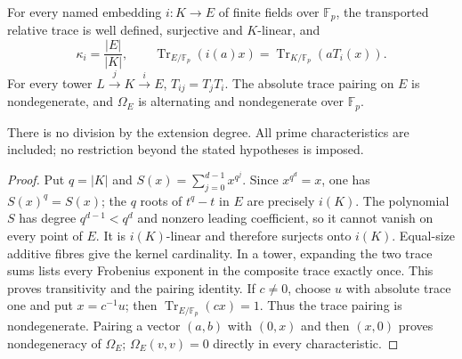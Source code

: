 \begin{theorem}
{\normalfont\statusProved}\quad
For every named embedding $i:K\to E$ of finite fields over
$\mathbb F_p$, the transported relative trace is well defined,
surjective and $K$-linear, and
\[
 \kappa_i=\frac{|E|}{|K|},\qquad
 \operatorname{Tr}_{E/\mathbb F_p}(i(a)x)
 =\operatorname{Tr}_{K/\mathbb F_p}(aT_i(x)).
\]
For every tower $L\xrightarrow{j}K\xrightarrow{i}E$,
$T_{ij}=T_jT_i$.  The absolute trace pairing on $E$ is nondegenerate,
and $\Omega_E$ is alternating and nondegenerate over $\mathbb F_p$.
\end{theorem}
\begin{scope}
There is no division by the extension degree.  All prime characteristics
are included; no restriction beyond the stated hypotheses is imposed.
\end{scope}
\begin{proof}
Put $q=|K|$ and $S(x)=\sum_{j=0}^{d-1}x^{q^j}$.
Since $x^{q^d}=x$, one has $S(x)^q=S(x)$; the $q$ roots of $t^q-t$
in $E$ are precisely $i(K)$.  The polynomial $S$ has degree
$q^{d-1}<q^d$ and nonzero leading coefficient, so it cannot vanish
on every point of $E$.  It is $i(K)$-linear and therefore surjects onto
$i(K)$.  Equal-size additive fibres give the kernel cardinality.
In a tower, expanding the two trace sums lists every Frobenius exponent
in the composite trace exactly once.  This proves transitivity and the
pairing identity.  If $c\ne0$, choose $u$ with absolute trace one and
put $x=c^{-1}u$; then $\operatorname{Tr}_{E/\mathbb F_p}(cx)=1$.
Thus the trace pairing is nondegenerate.  Pairing a vector $(a,b)$ with
$(0,x)$ and then $(x,0)$ proves nondegeneracy of $\Omega_E$;
$\Omega_E(v,v)=0$ directly in every characteristic.
\end{proof}

